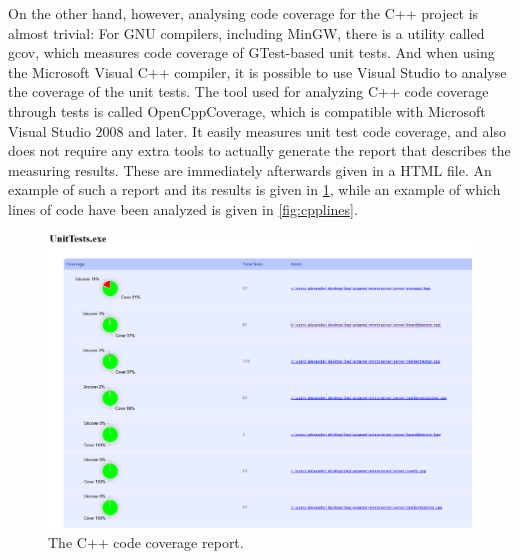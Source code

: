             On the other hand, however, analysing code coverage for the C++ 
            project is almost trivial: For GNU compilers, including MinGW, 
            there is a utility called gcov, which measures code coverage of 
            GTest-based unit tests. And when using the Microsoft Visual C++ 
            compiler, it is possible to use Visual Studio to analyse the 
            coverage of the unit tests. The tool used for analyzing C++
            code coverage through tests is called OpenCppCoverage, which
            is compatible with Microsoft Visual Studio 2008 and later.
            It easily measures unit test code coverage, and also does not
            require any extra tools to actually generate the report that
            describes the measuring results. These are immediately afterwards
            given in a HTML file. An example of such a report and its results
            is given in \ref{fig:cpppie}, while an example of which lines of code have
            been analyzed is given in \ref{fig:cpplines}.
            
            \begin{figure}[!ht]
                \centering
                \includegraphics[width=\textwidth]{CPPCoveragePie}
                \caption{The C++ code coverage report.}
                \label{fig:cpppie}
            \end{figure}
            
